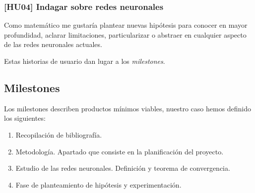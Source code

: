 \subsubsection*{ [HU04] Indagar sobre redes neuronales}

Como matemático me gustaría plantear nuevas hipótesis para conocer en mayor profundidad, 
aclarar limitaciones, particularizar o abstraer en cualquier aspecto de las redes neuronales actuales.



Estas historias de usuario dan lugar a los \textit{milestones}. 

\subsection{Milestones}  

Los milestones describen productos mínimos viables, nuestro caso hemos definido los siguientes: 

\begin{enumerate}
    \item Recopilación de bibliografía. 
    \item Metodología. Apartado que consiste en la planificación del proyecto. 
    \item Estudio de las redes neuronales. Definición y teorema de convergencia. 
    \item Fase de planteamiento de hipótesis y experimentación. 
\end{enumerate}  


